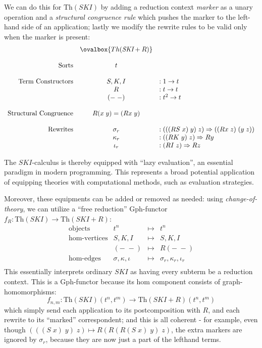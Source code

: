 \documentclass[a4paper,UKenglish]{article}
\theoremstyle{definition}
\newcommand{\Th}{\mathrm{Th}}
\newcommand{\Gph}{\mathrm{Gph}}
\begin{document}
We can do this for $\Th(SKI)$ by adding a reduction context \textit{marker} as a unary operation and a \textit{structural congruence rule} which pushes the marker to the left-hand side of an application; lastly we modify the rewrite rules to be valid only when the marker is present: 
\[\begin{array}{rcl}
& \ovalbox{Th(\textit{SKI}+R)} &\\\\
\text{Sorts} & t &\\\\
\text{Term Constructors} & S,K,I & :1 \to t\\
& R & : t \to t\\
& (-\; -) & : t^2 \to t\\\\
\text{Structural Congruence} & R(x\; y) = (Rx\; y) &\\\\
\mathrm{Rewrites} & \sigma_r & :(((RS\; x)\; y)\; z) \Rightarrow ((Rx\; z)\; (y\; z))\\
& \kappa_r & :((RK\; y)\; z) \Rightarrow Ry\\
& \iota_r & :(RI\; z) \Rightarrow Rz\\
\end{array}\]

The $SKI$-calculus is thereby equipped with ``lazy evaluation'', an essential paradigm in modern programming. This represents a broad potential application of equipping theories with computational methods, such as evaluation strategies.

Moreover, these equipments can be added or removed as needed: using \textit{change-of-theory}, we can utilize a ``free reduction'' $\Gph$-functor $f_R:\Th(SKI)\to \Th(SKI+R)$:
\[\begin{array}{rrcl}
\text{objects} & t^n & \mapsto & t^n\\
\text{hom-vertices} & S,K,I & \mapsto & S,K,I\\
& (-\; -) & \mapsto & R(-\; -)\\
\text{hom-edges} & \sigma, \kappa, \iota & \mapsto & \sigma_r, \kappa_r, \iota_r\\
\end{array}\]
This essentially interprets ordinary $SKI$ as having every subterm be a reduction context. This is a $\Gph$-functor because its hom component consists of graph-homomorphisms: $$f_{n,m}: \Th(SKI)(t^n,t^m) \to \Th(SKI+R)(t^n,t^m)$$ which simply send each application to its postcomposition with $R$, and each rewrite to its ``marked'' correspondent; and this is all coherent - for example, even though $(((S\; x)\; y)\; z) \mapsto R(R(R(S\; x)\; y)\; z)$, the extra markers are ignored by $\sigma_r$, because they are now just a part of the lefthand terms.
\end{document}

